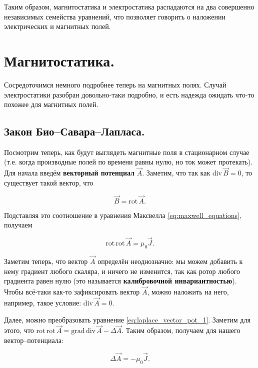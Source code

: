 \documentclass[12pt,a4paper]{article}
\numberwithin{equation}{section}
\numberwithin{equation}{section}
\newcommand{\grad}{\mathrm{grad}\,}
\newcommand{\rot}{\mathrm{rot}\,}
\renewcommand{\div}{\mathrm{div}\,}
\begin{document}
Таким образом, магнитостатика и электростатика распадаются на два
совершенно независимых семейства уравнений, что позволяет говорить о
наложении электрических и магнитных полей. 

\section{Магнитостатика.}
\label{sec:magnetostatics}

Сосредоточимся немного подробнее теперь на магнитных полях. Случай
электростатики разобран довольно-таки подробно, и есть надежда ожидать
что-то похожее для магнитных полей. 

\subsection{Закон Био--Савара--Лапласа.}
\label{sec:biot-savart-laplace}

Посмотрим теперь, как будут выглядеть магнитные поля в стационарном
случае (т.е. когда производные полей по времени равны нулю, но ток
может протекать). Для начала введём \textbf{векторный потенциал}
$\vec{A}$. Заметим, что так как $\div \vec{B} = 0$, то существует
такой вектор, что 

\begin{equation}
  \label{eq:def_vector_potential}
  \vec{B} = \rot \vec{A}.
\end{equation}

Подставляя это соотношение в уравнения Максвелла
\eqref{eq:maxwell_equations}, получаем 

\begin{equation}
  \label{eq:laplace_vector_pot_1}
  \rot \rot \vec{A} = \mu_0 \vec{J}.
\end{equation}

Заметим теперь, что вектор $\vec{A}$ определён неоднозначно: мы можем
добавить к нему градиент любого скаляра, и ничего не изменится, так
как ротор любого градиента равен нулю (это называется
\textbf{калибровочной инвариантностью}). Чтобы всё-таки как-то
зафиксировать вектор $\vec{A}$, можно наложить на него, например,
такое условие: $\div \vec{A} = 0$.

Далее, можно преобразовать уравнение
\eqref{eq:laplace_vector_pot_1}. Заметим для этого, что $\rot \rot
\vec{A} = \grad \div \vec{A} - \Delta \vec{A}$. Таким образом,
получаем для нашего вектор--потенциала: 

\begin{equation}
  \label{eq:laplace_vector_pot_2}
  \Delta \vec{A} = - \mu_0 \vec{J}. 
\end{equation}
\end{document}
